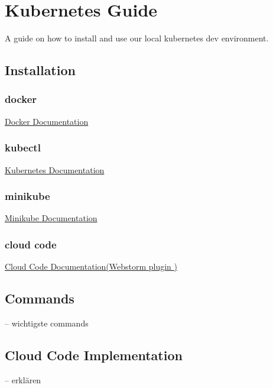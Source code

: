 \chapter{Kubernetes Guide}
A guide on how to install and use our local kubernetes dev environment.

\section{Installation}
\subsection{docker}
\href{https://docs.docker.com/get-docker/}{Docker Documentation}

\subsection{kubectl}
\href{https://kubernetes.io/docs/tasks/tools/#kubectl}{Kubernetes Documentation}

\subsection{minikube}
\href{https://minikube.sigs.k8s.io/docs/start/}{Minikube Documentation}

\subsection{cloud code}
\href{https://plugins.jetbrains.com/plugin/8079-cloud-code/}{Cloud Code Documentation(Webstorm plugin
)}

\section{Commands}
-- wichtigste commands

\section{Cloud Code Implementation}
-- erklären